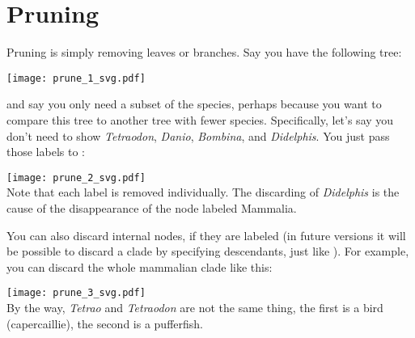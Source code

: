 \section{Pruning}
\label{sct_prune}

Pruning is simply removing leaves or branches. Say you have the following
tree:

\texttt{[image: prune\_1\_svg.pdf]}

and say you only need a subset of the species, perhaps because you want to
compare this tree to another tree with fewer species. Specifically, let's say
you don't need to show \textit{Tetraodon}, \textit{Danio}, \textit{Bombina},
and \textit{Didelphis}. You just pass those labels to \prune:

\texttt{[image: prune\_2\_svg.pdf]} \\
Note that each label is removed individually. The discarding of
\textit{Didelphis} is the cause of the disappearance of the node labeled
Mammalia.

You can also discard internal nodes, if they are labeled (in future versions
it will be possible to discard a clade by specifying descendants, just like
\clade). For example, you can discard the whole mammalian clade like this:

\texttt{[image: prune\_3\_svg.pdf]} \\
By the way, \textit{Tetrao} and \textit{Tetraodon} are not the same thing, the
first is a bird (capercaillie), the second is a pufferfish.
